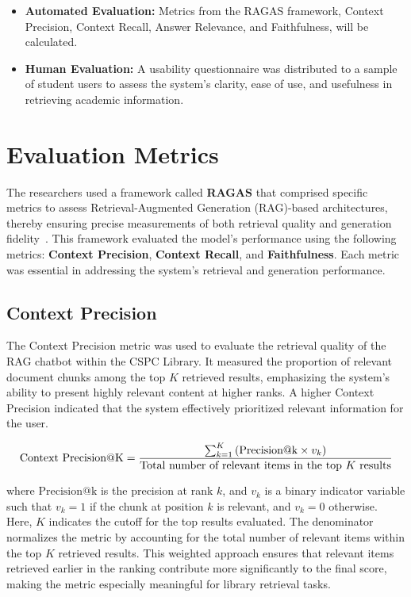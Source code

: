 \begin{refsection}
\begin{itemize}
    \item \textbf{Automated Evaluation:} Metrics from the RAGAS framework, Context Precision, Context Recall, Answer Relevance, and Faithfulness, will be calculated.
    \item \textbf{Human Evaluation:} A usability questionnaire was distributed to a sample of student users to assess the system’s clarity, ease of use, and usefulness in retrieving academic information.
\end{itemize}

\section{Evaluation Metrics}

\hspace{0.4cm}The researchers used a framework called \textbf{RAGAS} that comprised specific metrics to assess Retrieval-Augmented Generation (RAG)-based architectures, thereby ensuring precise measurements of both retrieval quality and generation fidelity~\cite{oubah2024advanced}. This framework evaluated the model's performance using the following metrics: \textbf{Context Precision}, \textbf{Context Recall}, and \textbf{Faithfulness}. Each metric was essential in addressing the system’s retrieval and generation performance.

\subsection*{Context Precision}

The Context Precision metric was used to evaluate the retrieval quality of the RAG chatbot within the CSPC Library. It measured the proportion of relevant document chunks among the top $K$ retrieved results, emphasizing the system's ability to present highly relevant content at higher ranks. A higher Context Precision indicated that the system effectively prioritized relevant information for the user.

\begin{equation}
\centering
\text{Context Precision@K} = 
\frac{
    \sum_{k=1}^{K} \left( \text{Precision@k} \times v_k \right)
}{
    \text{Total number of relevant items in the top } K \text{ results}
}
\end{equation}

where $\text{Precision@k}$ is the precision at rank $k$, and $v_k$ is a binary indicator variable such that $v_k = 1$ if the chunk at position $k$ is relevant, and $v_k = 0$ otherwise. Here, $K$ indicates the cutoff for the top results evaluated. The denominator normalizes the metric by accounting for the total number of relevant items within the top $K$ retrieved results. This weighted approach ensures that relevant items retrieved earlier in the ranking contribute more significantly to the final score, making the metric especially meaningful for library retrieval tasks.


\end{refsection}
